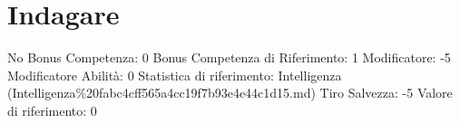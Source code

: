 \section{Indagare}\label{indagare}

\begin{description}
\tightlist
\item[Tags: ABI]
No Bonus Competenza: 0 Bonus Competenza di Riferimento: 1 Modificatore:
-5 Modificatore Abilità: 0 Statistica di riferimento: Intelligenza
(Intelligenza\%20fabc4cff565a4cc19f7b93e4e44c1d15.md) Tiro Salvezza: -5
Valore di riferimento: 0
\end{description}
